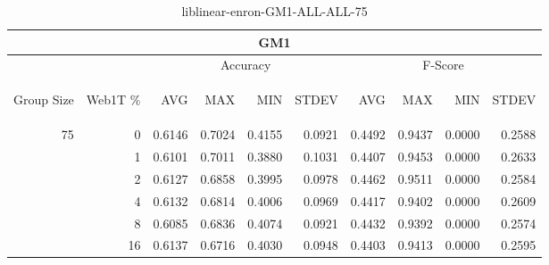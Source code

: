 \begin{center}
\begin{table}[htbp] 
 \begin{center}
\begin{tabular}{ | r | r | r | r | r | r | r | r | r | r |}
\hline
\multicolumn{10}{|c|}{GM1}\\
\hline
 & & \multicolumn{4}{|c|}{Accuracy} & \multicolumn{4}{|c|}{F-Score}\\ \cline{3-10}
\begin{sideways}Group Size\end{sideways} & \begin{sideways}Web1T \%\end{sideways} & \begin{sideways}AVG\end{sideways} & \begin{sideways}MAX\end{sideways} & \begin{sideways}MIN\end{sideways} & \begin{sideways}STDEV\end{sideways} & \begin{sideways}AVG\end{sideways} & \begin{sideways}MAX\end{sideways} & \begin{sideways}MIN\end{sideways} & \begin{sideways}STDEV\end{sideways}\\
\hline
\multirow{5}{*}{75}
 & 0 & 0.6146 & 0.7024 & 0.4155 & 0.0921 & 0.4492 & 0.9437 & 0.0000 & 0.2588\\ \cline{2-10}
 & 1 & 0.6101 & 0.7011 & 0.3880 & 0.1031 & 0.4407 & 0.9453 & 0.0000 & 0.2633\\ \cline{2-10}
 & 2 & 0.6127 & 0.6858 & 0.3995 & 0.0978 & 0.4462 & 0.9511 & 0.0000 & 0.2584\\ \cline{2-10}
 & 4 & 0.6132 & 0.6814 & 0.4006 & 0.0969 & 0.4417 & 0.9402 & 0.0000 & 0.2609\\ \cline{2-10}
 & 8 & 0.6085 & 0.6836 & 0.4074 & 0.0921 & 0.4432 & 0.9392 & 0.0000 & 0.2574\\ \cline{2-10}
 & 16 & 0.6137 & 0.6716 & 0.4030 & 0.0948 & 0.4403 & 0.9413 & 0.0000 & 0.2595\\ \cline{2-10}
\hline
\end{tabular}
\caption{liblinear-enron-GM1-ALL-ALL-75}
\label{table:liblinear-enron-GM1-ALL-ALL-75}
\end{center}
 \end{table}
\end{center}

